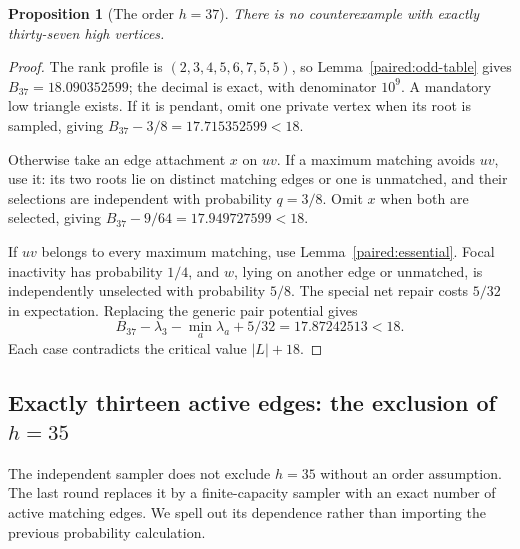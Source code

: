 \documentclass[11pt,a4paper]{article}
\newtheorem{proposition}[theorem]{Proposition}
\theoremstyle{definition}\newtheorem{definition}[theorem]{Definition}
\theoremstyle{remark}\newtheorem{remark}[theorem]{Remark}
\begin{document}
\begin{proposition}[The order $h=37$]\label{paired:h37}
There is no counterexample with exactly thirty-seven high vertices.
\end{proposition}
\begin{proof}
The rank profile is $(2,3,4,5,6,7,5,5)$, so
Lemma~\ref{paired:odd-table} gives $B_{37}=18.090352599$; the decimal
is exact, with denominator $10^9$. A mandatory low triangle exists.
If it is pendant, omit one private vertex when its root is sampled,
giving $B_{37}-3/8=17.715352599<18$.

Otherwise take an edge attachment $x$ on $uv$. If a maximum matching
avoids $uv$, use it: its two roots lie on distinct matching edges
or one is unmatched, and their selections are independent with
probability $q=3/8$. Omit $x$ when both are selected, giving
$B_{37}-9/64=17.949727599<18$.

If $uv$ belongs to every maximum matching, use
Lemma~\ref{paired:essential}. Focal inactivity has probability $1/4$,
and $w$, lying on another edge or unmatched, is independently
unselected with probability $5/8$. The special net repair costs
$5/32$ in expectation. Replacing the generic pair potential gives
\[
 B_{37}-\lambda_3-\min_a\lambda_a+5/32=17.87242513<18.
\]
Each case contradicts the critical value $|L|+18$.
\end{proof}

\subsection{Exactly thirteen active edges: the exclusion of \texorpdfstring{$h=35$}{h=35}}
\label{paired:fixed-active-section}

The independent sampler does not exclude $h=35$ without an order
assumption. The last round replaces it by a finite-capacity sampler
with an exact number of active matching edges. We spell out its
dependence rather than importing the previous probability calculation.
\end{document}
